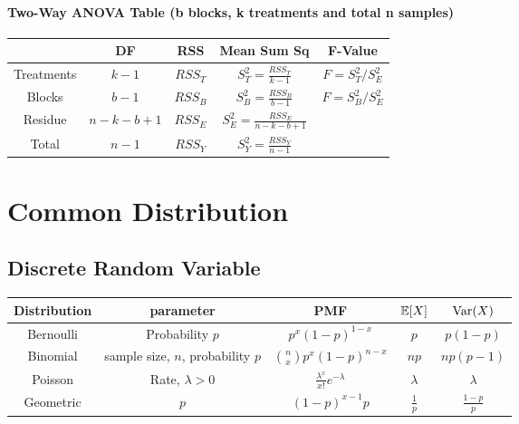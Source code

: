 \documentclass[10pt]{article}
\begin{document}
\paragraph{Two-Way ANOVA Table (b blocks, k treatments and total n samples)}
\begin{table}[ht]
	\centering
	\begin{tabular}{|c|c|c|c|c|}
			 & DF & RSS & Mean Sum Sq & F-Value \\
			\hline
			Treatments & $k-1$ & $RSS_T$& $S^2_T=\frac{RSS_T}{k-1}$ & $F=S^2_T/S^2_E$\\
			Blocks & $b-1$ & $RSS_B$ & $S_B^2=\frac{RSS_B}{b-1}$ & $F=S^2_B/S^2_E$\\
			Residue & $n-k-b+1$ & $RSS_E$ & $S_E^2=\frac{RSS_E}{n-k-b+1}$ & \\
			Total & $n-1$ & $RSS_Y$ & $S_Y^2=\frac{RSS_Y}{n-1}$& \\
	\end{tabular}
\end{table}

\newpage
\section{Common Distribution}
\subsection{Discrete Random Variable}
\begin{table}[h]
	\centering
	\begin{tabular}{c|c|c|c|c}
		Distribution &  parameter & PMF & $\mathbb{E}[X]$ & $\text{Var}(X)$\\
		\hline
		Bernoulli & Probability $p$ & $p^x(1-p)^{1-x}$ & $p$ & $p(1-p)$ \\
		\hline
		Binomial & sample size, $n$, probability $p$ & $\binom{n}{x}p^x(1-p)^{n-x}$ & $np$ & $np(p-1)$ \\
		\hline
		Poisson & Rate, $\lambda>0$ & $\frac{\lambda^x}{x!}e^{-\lambda}$ & $\lambda$  & $\lambda$\\
		\hline
		Geometric & $p$ & $(1-p)^{x-1}p$ & $\frac{1}{p}$ & $\frac{1-p}{p}$ \\
	\end{tabular}
\end{table}
\end{document}
